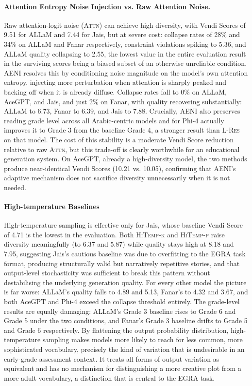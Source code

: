 \documentclass[11pt]{article}
\begin{document}
\paragraph{Attention Entropy Noise Injection vs. Raw Attention Noise.}
Raw attention-logit noise (\textsc{Attn}) can achieve high diversity, with Vendi Scores of 9.51 for ALLaM and 7.44 for Jais, but at severe cost: collapse rates of 28\% and 34\% on ALLaM and Fanar respectively, constraint violations spiking to 5.36, and ALLaM quality collapsing to 2.55, the lowest value in the entire evaluation result in the surviving scores being a biased subset of an otherwise unreliable condition. \textsc{AENI} resolves this by conditioning noise magnitude on the model's own attention entropy, injecting more perturbation when attention is sharply peaked and backing off when it is already diffuse. Collapse rates fall to 0\% on ALLaM, AceGPT, and Jais, and just 2\% on Fanar, with quality recovering substantially: ALLaM to 6.73, Fanar to 6.39, and Jais to 7.88. Crucially, \textsc{AENI} also preserves reading grade level across all Arabic-centric models and for Phi-4 actually improves it to Grade 3 from the baseline Grade 4, a stronger result than \textsc{L-Res} on that model. The cost of this stability is a moderate Vendi Score reduction relative to raw \textsc{Attn}, but this trade-off is clearly worthwhile for an educational generation system. On AceGPT, already a high-diversity model, the two methods produce near-identical Vendi Scores (10.21 vs. 10.05), confirming that \textsc{AENI}'s adaptive mechanism does not sacrifice diversity unnecessarily when it is not needed.


\paragraph{High-temperature Baselines} High-temperature sampling is effective only for Jais, whose baseline Vendi Score of 4.71 is the lowest in the evaluation. Both \textsc{HiTemp-k} and \textsc{HiTemp-p} raise diversity meaningfully (to 6.37 and 5.87) while quality stays high at 8.18 and 7.95, suggesting Jais's cautious baseline was due to overfitting to the EGRA task format, producing structurally valid but narratively repetitive stories, and that output-level stochasticity was sufficient to break this pattern without destabilising the underlying generation quality. For every other model the picture is far worse: ALLaM's quality falls to 4.89 and 5.13, Fanar's to 4.32 and 3.67, and both AceGPT and Phi-4 exceed the collapse threshold entirely. The grade-level results are equally damaging: ALLaM's Grade 3 baseline rises to Grade 6 and Grade 5 under the two conditions, and Fanar's Grade 3 baseline drifts to Grade 5 and Grade 6 respectively. By flattening the output probability distribution, high-temperature sampling makes models more likely to reach for less common, more sophisticated vocabulary, precisely the kind of variation that is undesirable in an early-grade assessment context. It treats all forms of output variation as equivalent and has no mechanism for distinguishing a more creative plot from a more adult vocabulary, a distinction that is central to the EGRA task.
\end{document}
